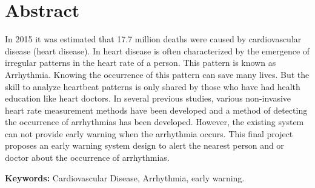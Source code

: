 \chapter*{Abstract}

In 2015 it was estimated that 17.7 million deaths were caused by cardiovascular disease (heart disease). In heart disease is often characterized by the emergence of irregular patterns in the heart rate of a person. This pattern is known as Arrhythmia. Knowing the occurrence of this pattern can save many lives. But the skill to analyze heartbeat patterns is only shared by those who have had health education like heart doctors. In several previous studies, various non-invasive heart rate measurement methods have been developed and a method of detecting the occurrence of arrhythmias has been developed. However, the existing system can not provide early warning when the arrhythmia occurs. This final project proposes an early warning system design to alert the nearest person and or doctor about the occurrence of arrhythmias.

\vspace{0.5 cm}
\begin{flushleft}
{\textbf{Keywords:} Cardiovascular Disease, Arrhythmia, early warning.}
\end{flushleft}